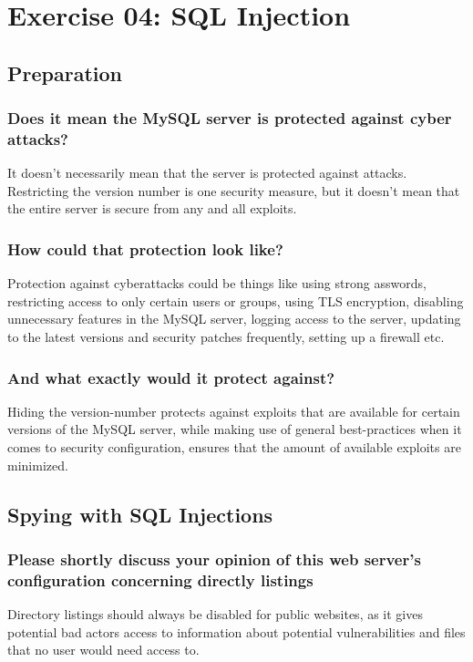 \section{Exercise 04: SQL Injection}
\subsection{Preparation}
\subsubsection{Does it mean the MySQL server is protected against cyber attacks?}
It doesn't necessarily mean that the server is protected against attacks. Restricting the version number is one security measure, but it doesn't mean that the entire server is secure from any and all exploits.

\subsubsection{How could that protection look like?}
Protection against cyberattacks could be things like using strong asswords, restricting access to only certain users or groups, using TLS encryption, disabling unnecessary features in the MySQL server, logging access to the server, updating to the latest versions and security patches frequently, setting up a firewall etc.
\subsubsection{And what exactly would it protect against?}
Hiding the version-number protects against exploits that are available for certain versions of the MySQL server, while making use of general best-practices when it comes to security configuration, ensures that the amount of available exploits are minimized.

\subsection{Spying with SQL Injections}
\subsubsection{Please shortly discuss your opinion of this web server's configuration concerning directly listings}
Directory listings should always be disabled for public websites, as it gives potential bad actors access to information about potential vulnerabilities and files that no user would need access to.

